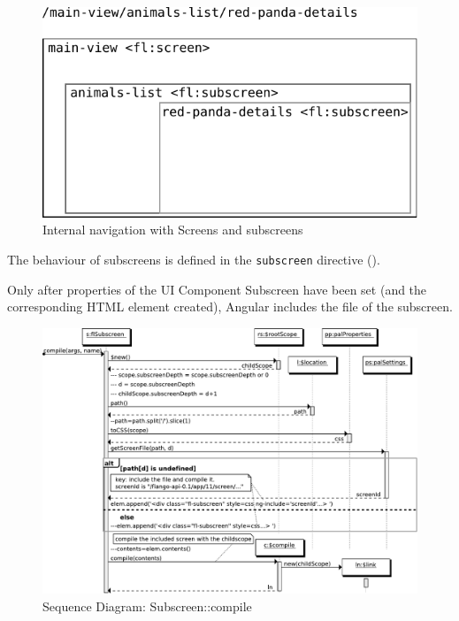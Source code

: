 \begin{figure}[htb]
    \centering
    \includegraphics{figures/design/internal-navigation.pdf}
    \caption{Internal navigation with Screens and subscreens}
    \label{fig:design-internal-navigation}
\end{figure}

The behaviour of subscreens is defined in the \texttt{subscreen} directive ().

Only after properties of the UI Component Subscreen have been set (and the corresponding \ac{HTML} element created), Angular includes the file of the subscreen.

\begin{figure}
    \centering
    \includegraphics{figures/design/seqdia/subscreen-compile.pdf}
    \caption{Sequence Diagram: Subscreen::compile}
    \label{fig:design-seqdia-subscreen-compile}
\end{figure}

